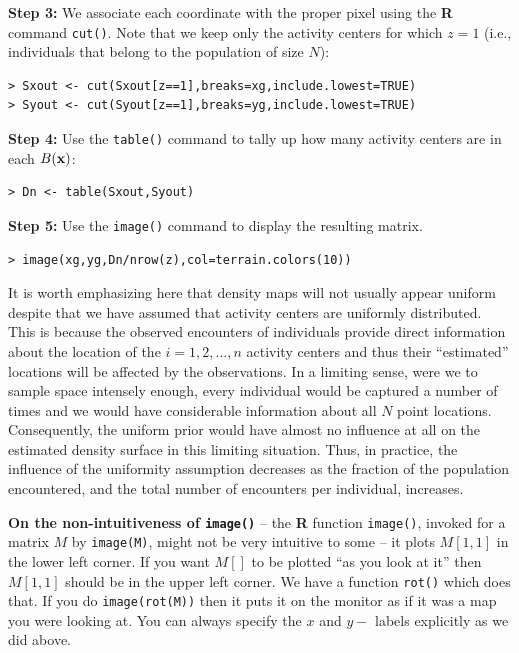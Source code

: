 {\flushleft \bf Step 3:} We associate each coordinate with the proper
pixel using the {\bf R} command \mbox{\tt cut()}. Note that we keep only
the activity centers for which $z=1$ (i.e., individuals that belong to
the population of size $N$):
\begin{verbatim}
> Sxout <- cut(Sxout[z==1],breaks=xg,include.lowest=TRUE)
> Syout <- cut(Syout[z==1],breaks=yg,include.lowest=TRUE)
\end{verbatim}

{\flushleft \bf Step 4:} Use the \mbox{\tt table()} command to tally
up how many activity centers are in each $B({\bf x})$:
\begin{verbatim}
> Dn <- table(Sxout,Syout)
\end{verbatim}

{\flushleft \bf Step 5:} Use the \mbox{\tt image()} command to display
the resulting matrix.
\begin{verbatim}
> image(xg,yg,Dn/nrow(z),col=terrain.colors(10))
\end{verbatim}

It is worth emphasizing here that density maps will not usually appear
uniform despite that we have assumed that activity centers are
uniformly distributed. This is because the observed encounters of
individuals provide direct information about the location of the
$i=1,2,\ldots,n$ activity centers and thus their ``estimated''
locations will be affected by the observations. In a limiting sense,
were we to sample space intensely enough, every individual would be
captured a number of times and we would have considerable information
about all $N$ point locations. Consequently, the uniform prior would
have almost no influence at all on the estimated density surface in
this limiting situation. Thus, in practice, the influence of the
uniformity assumption decreases as the fraction of the population
encountered, and the total number of encounters per individual, increases.

{\bf On the non-intuitiveness of \mbox{\tt image()} } -- the {\bf R}
function \mbox{\tt image()}, invoked for a matrix $M$ by \mbox{\tt image(M)}, might
not be very intuitive to some -- it plots $M[1,1]$ in the lower left
corner. If you want $M[]$ to be plotted ``as
you look at it'' then $M[1,1]$ should be in the upper left corner.  We
have a function \mbox{\tt rot()} which does that. If you do \mbox{\tt image(rot(M))} then it
puts it on the monitor as if it was a map you were looking at.  You
can always specify the $x$ and $y-$ labels explicitly as we did above.

